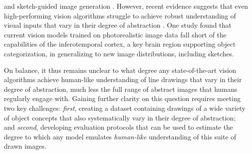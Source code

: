 \documentclass{article}
\begin{document}
\cite{vinker2022clipasso, qiu2022emergent, wang2022sketchknitter} and sketch-guided image generation \cite{lu2018image, zhang2021sketch2model, wang20223d, voynov2023sketch, lin2023sketchfacenerf}.
However, recent evidence suggests that even high-performing vision algorithms struggle to achieve robust understanding of visual inputs that vary in their degree of abstraction \cite{baker2018abstract, singer2022photos, fan2020pragmatic}. 
One study found that current vision models trained on photorealistic image data fall short of the capabilities of the inferotemporal cortex, a key brain region supporting object categorization, in generalizing to new image distributions, including sketches.

On balance, it thus remains unclear to what degree any state-of-the-art vision algorithms achieve human-like understanding of line drawings that vary in their degree of abstraction, much less the full range of abstract images that humans regularly engage with. 
Gaining further clarity on this question requires meeting two key challenges: \textit{first}, creating a dataset containing drawings of a wide variety of object concepts that also systematically vary in their degree of abstraction; and \textit{second}, developing evaluation protocols that can be used to estimate the degree to which any model emulates \textit{human-like} understanding of this suite of drawn images.

\end{document}
